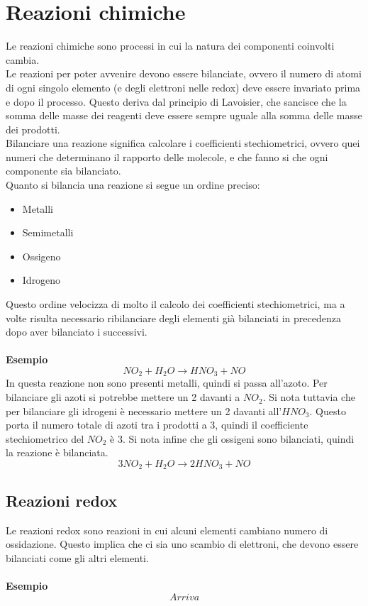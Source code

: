 \documentclass[12pt]{article}
\begin{document}
\section{Reazioni chimiche}
Le reazioni chimiche sono processi in cui la natura dei componenti coinvolti cambia. \\
Le reazioni per poter avvenire devono essere bilanciate, ovvero il numero di atomi di ogni singolo elemento (e degli elettroni nelle redox) deve essere invariato prima e dopo il processo. Questo 
deriva dal principio di Lavoisier, che sancisce che la somma delle masse dei reagenti deve essere sempre uguale alla somma delle masse dei prodotti. \\
Bilanciare una reazione significa calcolare i coefficienti stechiometrici, ovvero quei numeri che determinano il rapporto delle molecole, e che fanno si che ogni componente sia bilanciato. \\
Quanto si bilancia una reazione si segue un ordine preciso:
\begin{itemize}
    \item Metalli
    \item Semimetalli
    \item Ossigeno
    \item Idrogeno
\end{itemize}
Questo ordine velocizza di molto il calcolo dei coefficienti stechiometrici, ma a volte risulta necessario ribilanciare degli elementi già bilanciati in precedenza dopo aver bilanciato i 
successivi. \\ \\
\textbf{Esempio}
$$
    NO_2 + H_2O \rightarrow HNO_3 + NO
$$
In questa reazione non sono presenti metalli, quindi si passa all'azoto. Per bilanciare gli azoti si potrebbe mettere un 2 davanti a $NO_2$. Si nota tuttavia che per bilanciare gli idrogeni 
è necessario mettere un 2 davanti all'$HNO_3$. Questo porta il numero totale di azoti tra i prodotti a 3, quindi il coefficiente stechiometrico del $NO_2$ è 3. Si nota infine che gli ossigeni sono
bilanciati, quindi la reazione è bilanciata.
$$
    3NO_2 + H_2O \rightarrow 2HNO_3 + NO
$$
\subsection{Reazioni redox}
Le reazioni redox sono reazioni in cui alcuni elementi cambiano numero di ossidazione. Questo implica che ci sia uno scambio di elettroni, che devono essere bilanciati come gli altri elementi. \\ \\
\textbf{Esempio}
$$
    Arriva
$$
\end{document}
